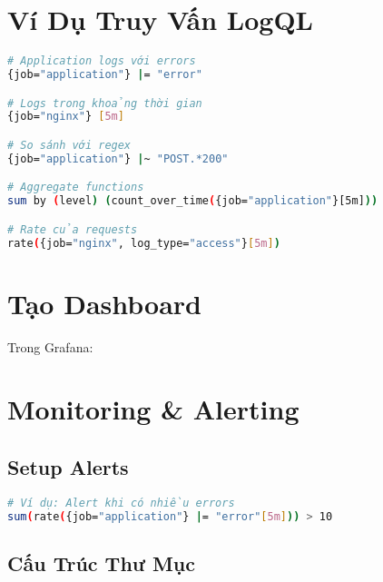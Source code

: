 \documentclass[a4paper,12pt]{article}
\begin{document}
\section{Ví Dụ Truy Vấn LogQL}

\begin{lstlisting}[language=bash]
# Application logs với errors
{job="application"} |= "error"

# Logs trong khoảng thời gian
{job="nginx"} [5m]

# So sánh với regex
{job="application"} |~ "POST.*200"

# Aggregate functions
sum by (level) (count_over_time({job="application"}[5m]))

# Rate của requests
rate({job="nginx", log_type="access"}[5m])
\end{lstlisting}

\section{Tạo Dashboard}

Trong Grafana:


\section{Monitoring \& Alerting}

\subsection{Setup Alerts}

\begin{lstlisting}[language=bash]
# Ví dụ: Alert khi có nhiều errors
sum(rate({job="application"} |= "error"[5m])) > 10
\end{lstlisting}

\subsection{Cấu Trúc Thư Mục}
\end{document}
